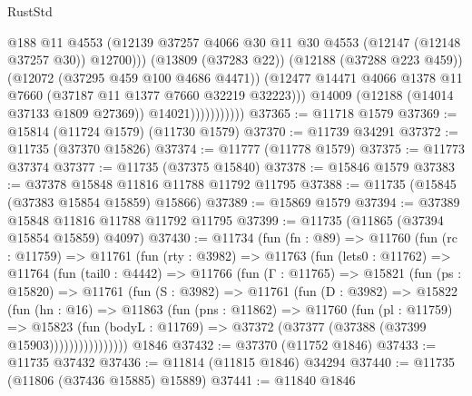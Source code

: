 \begin{lexlean}{RustStd}
\begin{coremodule}
                                @188
                                @11
                                @4553
                                (@12139
                                  @37257
                                  @4066
                                  @30
                                  @11
                                  @30
                                  @4553
                                  (@12147 (@12148 @37257 @30))
                                  @12700)))
                            (@13809 (@37283 @22))
                            (@12188 (@37288 @223 @459))
                            (@12072 (@37295 @459 @100 @4686 @4471))
                            (@12477
                              @14471
                              @4066
                              @1378
                              @11
                              @7660
                              (@37187 @11 @1377 @7660 @32219 @32223)))
                          @14009
                          (@12188 (@14014 @37133 @1809 @27369))
                          @14021)))))))))))
@37365 := @11718 @1579
@37369 := @15814 (@11724 @1579) (@11730 @1579)
@37370 := @11739 @34291
@37372 := @11735 (@37370 @15826)
@37374 := @11777 (@11778 @1579)
@37375 := @11773 @37374
@37377 := @11735 (@37375 @15840)
@37378 := @15846 @1579
@37383 := @37378 @15848 @11816 @11788 @11792 @11795
@37388 := @11735 (@15845 (@37383 @15854 @15859) @15866)
@37389 := @15869 @1579
@37394 := @37389 @15848 @11816 @11788 @11792 @11795
@37399 := @11735 (@11865 (@37394 @15854 @15859) @4097)
@37430 := @11734
    (fun (fn : @89) =>
    @11760
      (fun (rc : @11759) =>
      @11761
        (fun (rty : @3982) =>
        @11763
          (fun (lets0 : @11762) =>
          @11764
            (fun (tail0 : @4442) =>
            @11766
              (fun (Γ : @11765) =>
              @15821
                (fun (ps : @15820) =>
                @11761
                  (fun (S : @3982) =>
                  @11761
                    (fun (D : @3982) =>
                    @15822
                      (fun (hn : @16) =>
                      @11863
                        (fun (pns : @11862) =>
                        @11760
                          (fun (pl : @11759) =>
                          @15823
                            (fun (bodyL : @11769) =>
                            @37372 (@37377 (@37388 (@37399 @15903))))))))))))))))
    @1846
@37432 := @37370 (@11752 @1846)
@37433 := @11735 @37432
@37436 := @11814 (@11815 @1846) @34294
@37440 := @11735 (@11806 (@37436 @15885) @15889)
@37441 := @11840 @1846

\end{coremodule}
\end{lexlean}
